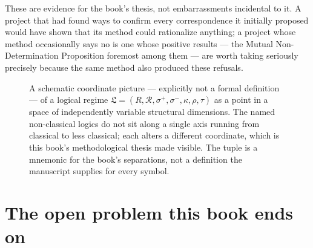 These are evidence for the book's thesis, not embarrassments incidental
to it. A project that had found ways to confirm every correspondence it
initially proposed would have shown that its method could rationalize
anything; a project whose method occasionally says no is one whose
positive results --- the Mutual Non-Determination Proposition foremost
among them --- are worth taking seriously precisely because the same
method also produced these refusals.

\begin{figure}[htbp]
\centering
{}
\caption{A schematic coordinate picture --- explicitly not a formal
definition --- of a logical regime
$\mathfrak{L} = (R, \mathcal{R}, \sigma^+, \sigma^-, \kappa, \rho, \tau)$
as a point in a space of independently variable structural dimensions.
The named non-classical logics do not sit along a single axis running
from classical to less classical; each alters a different coordinate,
which is this book's methodological thesis made visible. The tuple is a
mnemonic for the book's separations, not a definition the manuscript
supplies for every symbol.}
\label{fig:regime-coordinates}
\end{figure}

\hypertarget{the-open-problem-this-book-ends-on}{%
\section{The open problem this book ends on}\label{the-open-problem-this-book-ends-on}}

